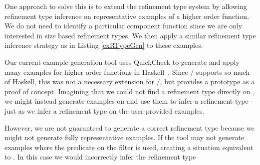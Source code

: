 One approach to solve this is to extend the refinement type system by allowing refinement type inference on representative examples of a higher order function.
We do not need to identify a particular component function since we are only interested in size based refinement types.
We then apply a similar refinement type inference strategy as in Listing \ref{exRTypeGen} to these examples.

Our current example generation tool uses QuickCheck to generate and apply many examples for higher order functions in Haskell~\cite{quickcheck}.
Since \lhask/ supports so much of Haskell, this was not a necessary extension for \ourTool/, but provides a prototype as a proof of concept.
Imagining that we could not find a refinement type directly on , we might instead generate examples on and use them to infer a refinement type - just as we infer a refinement type on the user-provided examples.

However, we are not guaranteed to generate a correct refinement type because we might not generate fully representative examples.
If the tool may not generate examples where the predicate on the filter is used, creating a situation equivalent to .
In this case we would incorrectly infer the refinement type 